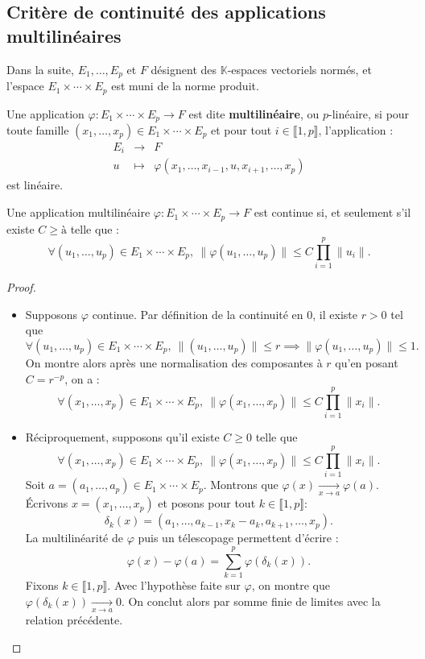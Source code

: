 \documentclass[french]{article}
\newcommand{\K}{\mathbb{K}}
\theoremstyle{plain}
\theoremstyle{definition}
\theoremstyle{remark}
\begin{document}
\subsection{Critère de continuité des applications multilinéaires}

Dans la suite, $E_1,\ldots,E_p$ et $F$ désignent des $\K$-espaces vectoriels normés, et l'espace $E_1\times\cdots\times E_p$ est muni de la norme produit.

\begin{dfn}
	Une application $\varphi:E_1\times\cdots\times E_p\to F$ est dite \textbf{multilinéaire}, ou $p$-linéaire, si pour toute famille $(x_1,\ldots,x_p)\in E_1\times\cdots\times E_p$ et pour tout $i\in\llbracket1,p\rrbracket$, l'application : $$\begin{array}{rcl}
		E_i&\longrightarrow&F\\
		u&\longmapsto&\varphi(x_1,\ldots,x_{i-1},u,x_{i+1},\ldots,x_p)
	\end{array}$$ est linéaire.
\end{dfn}

\begin{thm}{}%
	Une application multilinéaire $\varphi:E_1\times\cdots\times E_p\to F$ est continue si, et seulement s'il existe $C\geqslant à$ telle que : $$\forall (u_1,\ldots,u_p)\in E_1\times\cdots\times E_p,\ \lVert \varphi(u_1,\ldots,u_p)\rVert\leqslant C\prod_{i=1}^{p}\lVert u_i\rVert.$$
\end{thm}
\begin{proof}
	\begin{itemize}
		\item Supposons $\varphi$ continue. Par définition de la continuité en $0$, il existe $r>0$ tel que $$\forall (u_1,\ldots,u_p)\in E_1\times\cdots\times E_p,\ \lVert (u_1,\ldots,u_p)\rVert\leqslant r\implies\lVert\varphi(u_1,\ldots,u_p)\rVert\leqslant1.$$ On montre alors après une normalisation des composantes à $r$ qu'en posant $C=r^{-p}$, on a : $$\forall (x_1,\ldots,x_p)\in E_1\times\cdots\times E_p,\ \lVert \varphi(x_1,\ldots,x_p)\rVert\leqslant C\prod_{i=1}^{p}\lVert x_i\rVert.$$
		\item Réciproquement, supposons qu'il existe $C\geqslant 0$ telle que
		$$\forall (x_1,\ldots,x_p)\in E_1\times\cdots\times E_p,\ \lVert \varphi(x_1,\ldots,x_p)\rVert\leqslant C\prod_{i=1}^{p}\lVert x_i\rVert.$$ Soit $a=(a_1,\ldots,a_p)\in E_1\times\cdots\times E_p$. Montrons que $\varphi(x)\xrightarrow[x\to a]{}\varphi(a)$. Écrivons $x=(x_1,\ldots,x_p)$ et posons pour tout $k\in\llbracket 1,p\rrbracket$: $$\delta_k(x)=(a_1,\ldots,a_{k-1},x_k-a_k,a_{k+1},\ldots,x_p).$$ La multilinéarité de $\varphi$ puis un télescopage permettent d'écrire : $$\varphi(x)-\varphi(a)=\sum_{k=1}^{p}\varphi(\delta_k(x)).$$ Fixons $k\in\llbracket1,p\rrbracket$. Avec l'hypothèse faite sur $\varphi$, on montre que $\varphi(\delta_k(x))\xrightarrow[x\to a]{}0$. On conclut alors par somme finie de limites avec la relation précédente.
	\end{itemize}
\end{proof}
\end{document}
